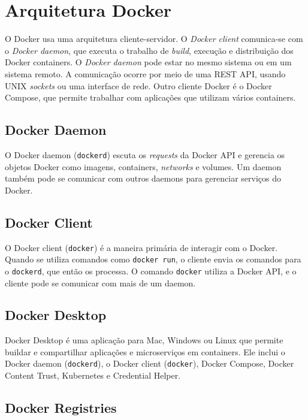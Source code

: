 \section{Arquitetura Docker}

O Docker usa uma arquitetura cliente-servidor. O \textit{Docker client} comunica-se com o \textit{Docker daemon}, que executa o trabalho de \textit{build}, execução e distribuição dos Docker containers. O \textit{Docker daemon} pode estar no mesmo sistema ou em um sistema remoto. A comunicação ocorre por meio de uma REST API, usando UNIX \textit{sockets} ou uma interface de rede. Outro cliente Docker é o Docker Compose, que permite trabalhar com aplicações que utilizam vários containers.

\subsection{Docker Daemon}

O Docker daemon (\texttt{dockerd}) escuta os \textit{requests} da Docker API e gerencia os objetos Docker como imagens, containers, \textit{networks} e volumes. Um daemon também pode se comunicar com outros daemons para gerenciar serviços do Docker.

\subsection{Docker Client}

O Docker client (\texttt{docker}) é a maneira primária de interagir com o Docker. Quando se utiliza comandos como \texttt{docker run}, o cliente envia os comandos para o \texttt{dockerd}, que então os processa. O comando \texttt{docker} utiliza a Docker API, e o cliente pode se comunicar com mais de um daemon.

\subsection{Docker Desktop}

Docker Desktop é uma aplicação para Mac, Windows ou Linux que permite buildar e compartilhar aplicações e microserviços em containers. Ele inclui o Docker daemon (\texttt{dockerd}), o Docker client (\texttt{docker}), Docker Compose, Docker Content Trust, Kubernetes e Credential Helper.

\subsection{Docker Registries}

